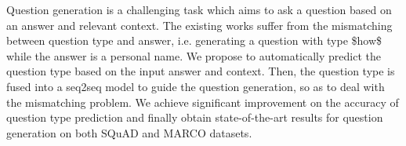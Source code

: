 Question generation is a challenging task which aims to ask a question based on an answer and relevant context. The existing works suffer from the mismatching between question type and answer, i.e. generating a question with type \$how\$ while the answer is a personal name. We propose to automatically predict the question type based on the input answer and context. Then, the question type is fused into a seq2seq model to guide the question generation, so as to deal with the mismatching problem. We achieve significant improvement on the accuracy of question type prediction and finally obtain state-of-the-art results for question generation on both SQuAD and MARCO datasets.